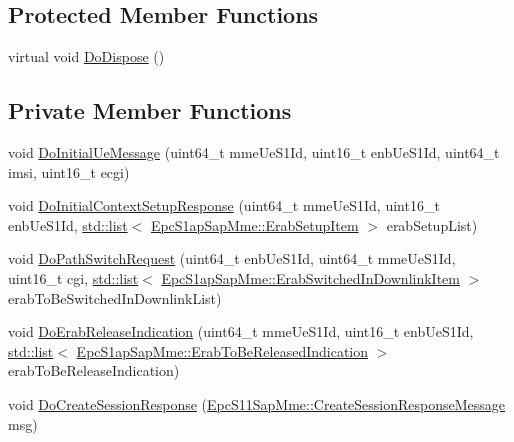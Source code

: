 \subsection*{Protected Member Functions}
\begin{DoxyCompactItemize}
\item 
virtual void \hyperlink{classns3_1_1EpcMmeApplication_ad11b5b5da8db97f6544be1677585def7}{Do\+Dispose} ()
\end{DoxyCompactItemize}
\subsection*{Private Member Functions}
\begin{DoxyCompactItemize}
\item 
void \hyperlink{classns3_1_1EpcMmeApplication_a550a2feeb9c3395569cce3ae0cabaec6}{Do\+Initial\+Ue\+Message} (uint64\+\_\+t mme\+Ue\+S1\+Id, uint16\+\_\+t enb\+Ue\+S1\+Id, uint64\+\_\+t imsi, uint16\+\_\+t ecgi)
\item 
void \hyperlink{classns3_1_1EpcMmeApplication_a4fe0dde1b303ca2852232676a50dcd3e}{Do\+Initial\+Context\+Setup\+Response} (uint64\+\_\+t mme\+Ue\+S1\+Id, uint16\+\_\+t enb\+Ue\+S1\+Id, \hyperlink{openflow-interface_8h_afd9bcfa176617760671b67580f536fa7}{std\+::list}$<$ \hyperlink{structns3_1_1EpcS1apSap_1_1ErabSetupItem}{Epc\+S1ap\+Sap\+Mme\+::\+Erab\+Setup\+Item} $>$ erab\+Setup\+List)
\item 
void \hyperlink{classns3_1_1EpcMmeApplication_a0b9c14b91de59dc84c25d2bb08e75f6d}{Do\+Path\+Switch\+Request} (uint64\+\_\+t enb\+Ue\+S1\+Id, uint64\+\_\+t mme\+Ue\+S1\+Id, uint16\+\_\+t cgi, \hyperlink{openflow-interface_8h_afd9bcfa176617760671b67580f536fa7}{std\+::list}$<$ \hyperlink{structns3_1_1EpcS1apSap_1_1ErabSwitchedInDownlinkItem}{Epc\+S1ap\+Sap\+Mme\+::\+Erab\+Switched\+In\+Downlink\+Item} $>$ erab\+To\+Be\+Switched\+In\+Downlink\+List)
\item 
void \hyperlink{classns3_1_1EpcMmeApplication_a5e2d4778b2dad47b52cffee327f39968}{Do\+Erab\+Release\+Indication} (uint64\+\_\+t mme\+Ue\+S1\+Id, uint16\+\_\+t enb\+Ue\+S1\+Id, \hyperlink{openflow-interface_8h_afd9bcfa176617760671b67580f536fa7}{std\+::list}$<$ \hyperlink{structns3_1_1EpcS1apSap_1_1ErabToBeReleasedIndication}{Epc\+S1ap\+Sap\+Mme\+::\+Erab\+To\+Be\+Released\+Indication} $>$ erab\+To\+Be\+Release\+Indication)
\item 
void \hyperlink{classns3_1_1EpcMmeApplication_a9eac41ff42392dd8615b51ec68b753b5}{Do\+Create\+Session\+Response} (\hyperlink{structns3_1_1EpcS11SapMme_1_1CreateSessionResponseMessage}{Epc\+S11\+Sap\+Mme\+::\+Create\+Session\+Response\+Message} msg)

\end{DoxyCompactItemize}
